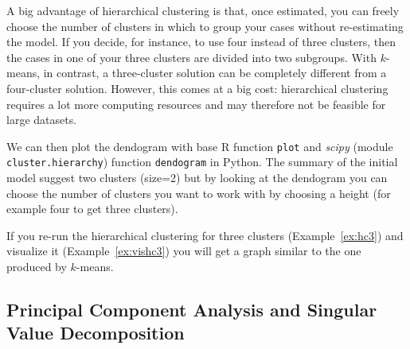 A big advantage of hierarchical clustering is that, once estimated,
you can freely choose the number of clusters in which to group your
cases without re-estimating the model. If you decide, for instance, to
use four instead of three clusters, then the cases in one of
your three clusters are divided into two subgroups. With $k$-means, in
contrast, a three-cluster solution can be completely different from a
four-cluster solution. However, this comes at a big cost: hierarchical
clustering requires a lot more computing resources and may therefore
not be feasible for large datasets.


We can then plot the dendogram  with base R function \texttt{plot} and \emph{scipy} (module \texttt{cluster.hierarchy}) function \texttt{dendogram} in Python. The summary of the initial model suggest  two clusters (size=2) but by looking at the dendogram you can choose the number of clusters you want to work with by choosing a height (for example four to get three clusters).


If you re-run the hierarchical clustering for three clusters (Example~\ref{ex:hc3}) and visualize it (Example~\ref{ex:vishc3}) you will get a graph similar to the one produced by $k$-means.




\subsection{Principal Component Analysis and Singular Value Decomposition} \label{sec:pcasvd}

